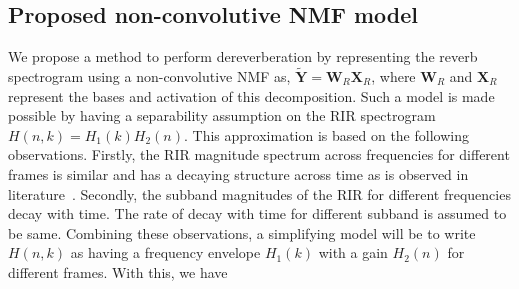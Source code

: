 \subsection{Proposed non-convolutive NMF model}
\label{sec:PropNMF}
We propose a method to perform dereverberation by representing the reverb spectrogram using a non-convolutive NMF as, $\mathbf{\tilde{Y}}=\mathbf{W}_R\mathbf{X}_R$, where $\mathbf{W}_R$ and $\mathbf{X}_R$ represent the bases and activation of this decomposition. Such a model is made possible by having a separability assumption on the RIR spectrogram $H(n,k)=H_1(k)H_2(n)$. 
This approximation is based on the following observations. 
Firstly, the RIR magnitude spectrum across frequencies for different frames is similar and has a decaying structure across time as is observed in literature~\cite{wen2008blind}. Secondly, the subband magnitudes of the RIR for different frequencies decay with time. The rate of decay with time for different subband is assumed to be same. Combining these observations, a simplifying model will be to write $H(n,k)$ as having a frequency envelope $H_1(k)$ with a gain $H_2(n)$ for different frames.
With this, we have

